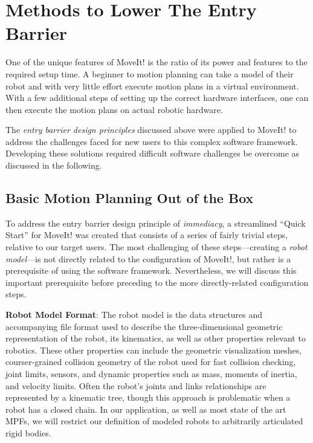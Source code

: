 \documentclass[10pt,journal,compsoc]{joser1}
\begin{document}
{%
\section{Methods to Lower The Entry Barrier}
\label{sec::lowering_barriers}

One of the unique features of MoveIt! is the ratio of its power and features to the required setup time. A beginner to motion planning can take a model of their robot and with very little effort execute motion plans in a virtual environment. With a few additional steps of setting up the correct hardware interfaces, one can then execute the motion plans on actual robotic hardware.

The \textit{entry barrier design principles} discussed above were applied to MoveIt! to address the challenges faced for new users to this complex software framework. Developing these solutions required difficult software challenges be overcome as discussed in the following.

\subsection{Basic Motion Planning Out of the Box}

To address the entry barrier design principle of \textit{immediacy}, a streamlined ``Quick Start'' for MoveIt! was created that consists of a series of fairly trivial steps, relative to our target users. The most challenging of these steps---creating a \textit{robot model}---is not directly related to the configuration of MoveIt!, but rather is a prerequisite of using the software framework. Nevertheless, we will discuss this important prerequisite before preceding to the more directly-related configuration steps.

{\bf Robot Model Format}: The robot model is the data structures and accompanying file format used to describe the three-dimensional geometric representation of the robot, its kinematics, as well as other properties relevant to robotics. These other properties can include the geometric visualization meshes, courser-grained collision geometry of the robot used for fast collision checking, joint limits, sensors, and dynamic properties such as mass, moments of inertia, and velocity limits. Often the robot's joints and links relationships are represented by a kinematic tree, though this approach is problematic when a robot has a closed chain. In our application, as well as most state of the art MPFs, we will restrict our definition of modeled robots to arbitrarily articulated rigid bodies. 

}
\end{document}
